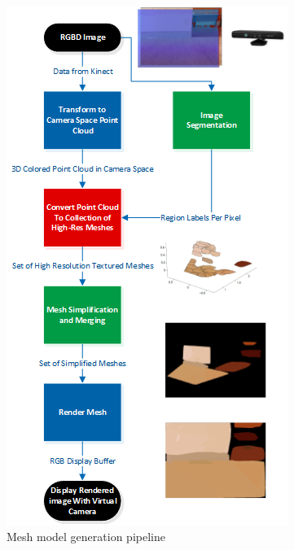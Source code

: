 \documentclass[letterpaper, 10 pt, conference]{ieeeconf}
\begin{document}
\begin{figure}[!ht]
    \centering
    \includegraphics[scale=1.0]{pipelineflowchart.png}
    \caption{Mesh model generation pipeline}
    \label{fig:pipeline}
\end{figure}

\printbibliography
\end{document}
